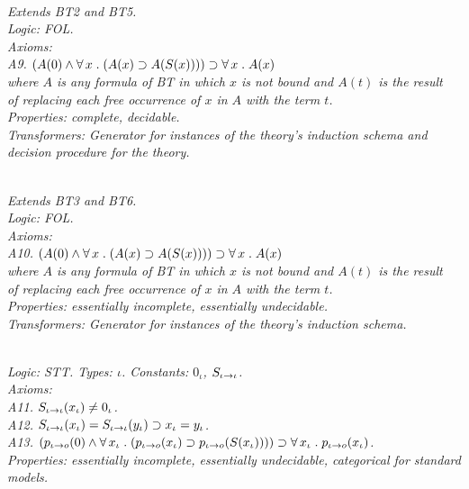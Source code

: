 \documentclass[fleqn]{llncs}
\begin{document}
\begin{biformthy}\em\ \\
Extends BT2 and BT5.\\
\emph{Logic}: FOL.\\
\emph{Axioms}:\\
\indent A9. $(A(0) \wedge \forall\, x \mathrel. (A(x) \supset A(S(x))))
\supset \forall\, x \mathrel. A(x)$\\
\indent 
where $A$ is any formula of BT{\thebiformthy} in which $x$ is not bound and $A(t)$ 
is the result\\
\indent
of replacing each free occurrence of $x$ in $A$ with the term $t$.\\
\emph{Properties}: complete, decidable.\\
\emph{Transformers}: Generator for instances of the theory's induction schema 
and decision procedure for the theory.
\end{biformthy}

\begin{biformthy}\em\ \\
Extends BT3 and BT6.\\ 
\emph{Logic}: FOL.\\
\emph{Axioms}:\\
\indent A10. $(A(0) \wedge \forall\, x \mathrel. (A(x) \supset A(S(x))))
\supset \forall\, x \mathrel. A(x)$\\
\indent 
where $A$ is any formula of BT{\thebiformthy} in which $x$ is not bound and $A(t)$
is the result\\
\indent
of replacing each free occurrence of $x$ in $A$ with the term $t$.\\
\emph{Properties}: essentially incomplete, essentially undecidable.\\
\emph{Transformers}: Generator for instances of the theory's induction schema.
\end{biformthy}

\begin{biformthy}\em\ \\
\emph{Logic}: STT. \emph{Types}: $\iota$. 
\emph{Constants}: $0_\iota$, $S_{\iota \rightarrow \iota}$.\\
\emph{Axioms}:\\
\indent A11. $S_{\iota \rightarrow \iota}(x_\iota) \not= 0_\iota$.\\
\indent A12. $S_{\iota \rightarrow \iota}(x_\iota) = S_{\iota \rightarrow \iota}(y_\iota) 
\supset x_\iota = y_\iota$.\\
\indent A13. $(p_{\iota \rightarrow o}(0) \wedge 
\forall\, x_\iota \mathrel. (p_{\iota \rightarrow o}(x_\iota) 
\supset p_{\iota \rightarrow o}(S(x_\iota)))) 
\supset \forall\, x_\iota \mathrel. p_{\iota \rightarrow o}(x_\iota)$.\\
\emph{Properties}: essentially incomplete, essentially undecidable, categorical for standard models.
\end{biformthy}
\end{document}
